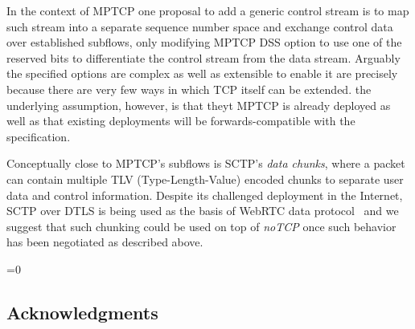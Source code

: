 \documentclass{sig-alternate-10pt}
\def\anon{1}        %
\begin{document}
In the context of MPTCP one proposal to add a generic control stream is to map such stream into a separate sequence number space and exchange control data over established subflows, only modifying MPTCP DSS option to use one of the reserved bits to differentiate the control stream from the data stream. Arguably the specified options are complex as well as extensible to enable it are precisely because there are very few ways in which TCP itself can be extended. the underlying assumption, however, is that theyt MPTCP is already deployed as well as that existing deployments will be forwards-compatible with the specification.

Conceptually close to MPTCP's subflows is SCTP's \emph{data chunks}, where a packet can contain multiple TLV (Type-Length-Value) encoded chunks to separate user data and control information. Despite its challenged deployment in the Internet, SCTP over DTLS is being used as the basis of WebRTC data protocol~\cite{Tuexen:wv} and we suggest that such chunking could be used on top of \emph{noTCP} once such behavior has been negotiated as described above.


%

\ifnum\anon=0
\subsection*{Acknowledgments}

\fi



{\footnotesize 


}

%
\end{document}
